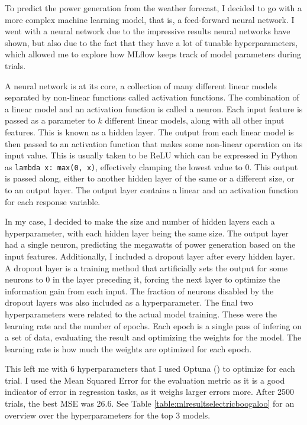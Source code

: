 To predict the power generation from the weather forecast, I decided to go with a more complex machine learning model, that is, a feed-forward neural network. I went with a neural network due to the impressive results neural networks have shown, but also due to the fact that they have a lot of tunable hyperparameters, which allowed me to explore how MLflow keeps track of model parameters during trials.

A neural network is at its core, a collection of many different linear models separated by non-linear functions called activation functions. The combination of a linear model and an activation function is called a neuron. Each input feature is passed as a parameter to $k$ different linear models, along with all other input features. This is known as a hidden layer. The output from each linear model is then passed to an activation function that makes some non-linear operation on its input value. This is usually taken to be ReLU which can be expressed in Python as \texttt{lambda x: max(0, x)}, effectively clamping the lowest value to 0. This output is passed along, either to another hidden layer of the same or a different size, or to an output layer. The output layer contains a linear and an activation function for each response variable.

In my case, I decided to make the size and number of hidden layers each a hyperparameter, with each hidden layer being the same size. The output layer had a single neuron, predicting the megawatts of power generation based on the input features. Additionally, I included a dropout layer after every hidden layer. A dropout layer is a training method that artificially sets the output for some neurons to 0 in the layer preceding it, forcing the next layer to optimize the information gain from each input. The fraction of neurons disabled by the dropout layers was also included as a hyperparameter. The final two hyperparameters were related to the actual model training. These were the learning rate and the number of epochs. Each epoch is a single pass of infering on a set of data, evaluating the result and optimizing the weights for the model. The learning rate is how much the weights are optimized for each epoch.

This left me with 6 hyperparameters that I used Optuna (\cite{optuna_2019}) to optimize for each trial. I used the Mean Squared Error for the evaluation metric as it is a good indicator of error in regression tasks, as it weighs larger errors more. After 2500 trials, the best MSE was 26.6. See Table \ref{table:mlresultselectricboogaloo} for an overview over the hyperparameters for the top 3 models.

